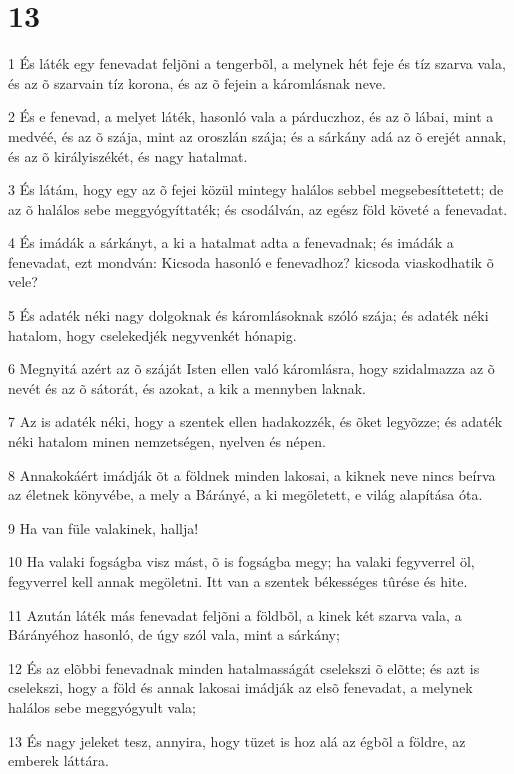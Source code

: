 \chapter{13}

\par 1 És láték egy fenevadat feljõni a tengerbõl, a melynek hét feje és tíz  szarva vala, és az õ szarvain tíz korona, és az õ fejein a káromlásnak neve.
\par 2 És e fenevad, a melyet láték, hasonló vala a párduczhoz, és az õ lábai, mint a medvéé, és az õ szája, mint az oroszlán szája; és a sárkány adá az õ erejét annak, és az õ királyiszékét, és nagy hatalmat.
\par 3 És látám, hogy egy az õ fejei közül mintegy halálos sebbel megsebesíttetett; de az õ halálos sebe meggyógyíttaték; és csodálván, az egész föld követé a fenevadat.
\par 4 És imádák a sárkányt, a ki a hatalmat adta a fenevadnak; és imádák a fenevadat, ezt mondván: Kicsoda hasonló e fenevadhoz? kicsoda viaskodhatik õ vele?
\par 5 És adaték néki nagy dolgoknak és káromlásoknak szóló szája; és adaték néki hatalom, hogy cselekedjék negyvenkét hónapig.
\par 6 Megnyitá azért az õ száját Isten ellen való káromlásra, hogy szidalmazza az õ nevét és az õ sátorát, és azokat, a kik a mennyben laknak.
\par 7 Az is adaték néki, hogy a szentek ellen hadakozzék, és õket legyõzze; és adaték néki hatalom minen nemzetségen, nyelven és népen.
\par 8 Annakokáért imádják õt a földnek minden lakosai, a kiknek neve nincs beírva az életnek könyvébe, a mely a Bárányé, a ki megöletett, e  világ alapítása óta.
\par 9 Ha van füle valakinek, hallja!
\par 10 Ha valaki fogságba visz mást, õ is fogságba megy; ha valaki fegyverrel öl, fegyverrel kell annak megöletni. Itt van a szentek békességes tûrése  és hite.
\par 11 Azután láték más fenevadat feljõni a földbõl, a kinek két szarva vala, a Bárányéhoz hasonló, de úgy szól vala, mint a sárkány;
\par 12 És az elõbbi fenevadnak minden hatalmasságát cselekszi õ elõtte; és azt is cselekszi, hogy a föld és annak lakosai imádják az elsõ fenevadat, a melynek halálos sebe meggyógyult vala;
\par 13 És nagy jeleket tesz, annyira, hogy tüzet is hoz alá az égbõl a földre, az emberek láttára.
